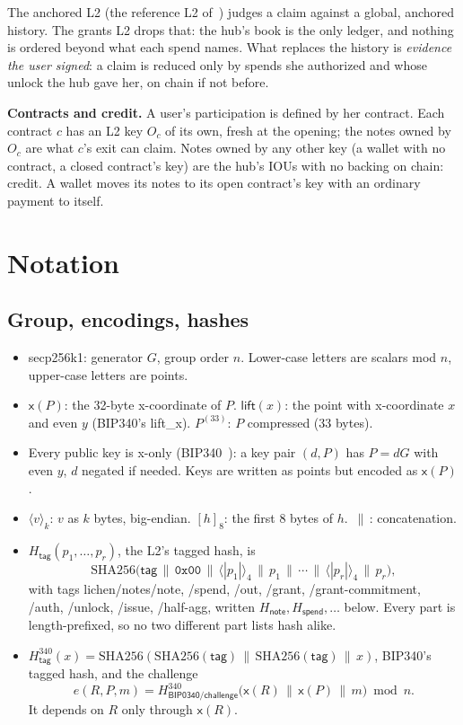 \documentclass[11pt]{article}
\theoremstyle{plain}
\theoremstyle{definition}
\newcommand{\cat}{\,\|\,}
\newcommand{\be}[2]{\langle #1\rangle_{#2}}          %
\newcommand{\pre}[1]{[#1]_8}                         %
\newcommand{\xo}[1]{\mathsf{x}(#1)}                  %
\newcommand{\Ht}[1]{H_{\textsf{#1}}}                 %
\newcommand{\Hb}[1]{H^{340}_{\textsf{#1}}}           %
\newcommand{\Oc}{O_c}
\begin{document}
The anchored L2 (the reference L2 of~\cite{lichen}) judges a claim
against a global, anchored history. The grants L2 drops that: the hub's
book is the only ledger, and nothing is ordered beyond what each spend
names. What replaces the history is \emph{evidence the user signed}: a
claim is reduced only by spends she authorized and whose unlock the hub
gave her, on chain if not before.

\textbf{Contracts and credit.} A user's participation is defined by her
contract. Each contract $c$ has an L2 key $\Oc$ of its own, fresh at the
opening; the notes owned by $\Oc$ are what $c$'s exit can claim. Notes
owned by any other key (a wallet with no contract, a closed contract's
key) are the hub's IOUs with no backing on chain: credit. A wallet moves
its notes to its open contract's key with an ordinary payment to itself.

\section{Notation}\label{sec:notation}

\subsection{Group, encodings, hashes}

\begin{itemize}[nosep]
\item secp256k1: generator $G$, group order $n$. Lower-case letters are
  scalars mod $n$, upper-case letters are points.
\item $\xo{P}$: the 32-byte x-coordinate of $P$. $\mathsf{lift}(x)$: the
  point with x-coordinate $x$ and even $y$ (BIP340's \textsf{lift\_x}).
  $P^{(33)}$: $P$ compressed (33 bytes).
\item Every public key is x-only (BIP340~\cite{bip340}): a key pair
  $(d, P)$ has $P = dG$ with even $y$, $d$ negated if needed. Keys are
  written as points but encoded as $\xo{P}$.
\item $\be{v}{k}$: $v$ as $k$ bytes, big-endian. $\pre{h}$: the first 8
  bytes of $h$. $\cat$: concatenation.
\item $\Ht{tag}(p_1, \dots, p_r)$, the L2's tagged hash, is
  \[
    \mathrm{SHA256}\big(\textsf{tag} \cat \texttt{0x00} \cat \be{|p_1|}{4}
    \cat p_1 \cat \cdots \cat \be{|p_r|}{4} \cat p_r\big),
  \]
  with tags \textsf{lichen/notes/note}, \textsf{/spend}, \textsf{/out},
  \textsf{/grant}, \textsf{/grant-commitment}, \textsf{/auth},
  \textsf{/unlock}, \textsf{/issue}, \textsf{/half-agg}, written
  $\Ht{note}, \Ht{spend}, \dots$ below. Every part is length-prefixed,
  so no two different part lists hash alike.
\item $\Hb{tag}(x) = \mathrm{SHA256}(\mathrm{SHA256}(\textsf{tag}) \cat
  \mathrm{SHA256}(\textsf{tag}) \cat x)$, BIP340's tagged hash, and the
  challenge
  \[
    e(R, P, m) = \Hb{BIP0340/challenge}\big(\xo{R} \cat \xo{P} \cat m\big) \bmod n.
  \]
  It depends on $R$ only through $\xo{R}$.
\end{itemize}
\end{document}
